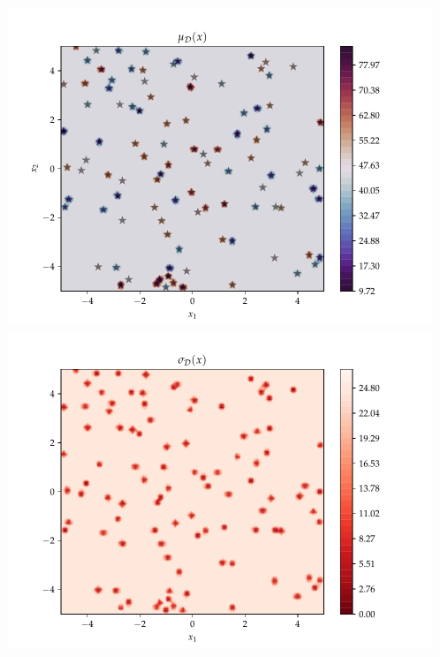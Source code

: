 \begin{figure}[h]
    \begin{minipage}[b]{0.49\textwidth}
      \includegraphics[trim=1.2cm 0.7cm 2cm 1cm,clip,width=\textwidth]{Figures/coco_reg/f23_Naive Gaussian Mixture Regression optimized-prior 12.pdf}
     \end{minipage}
     \hfill
     \begin{minipage}[b]{0.49\textwidth}
       \includegraphics[trim=1.2cm 0.7cm 2cm 1cm,clip,width=\textwidth]{Figures/coco_reg/f23_Naive Gaussian Mixture Regression optimized-prior 13.pdf}
    \end{minipage}
  \label{f23_reg_2D}
\end{figure}

